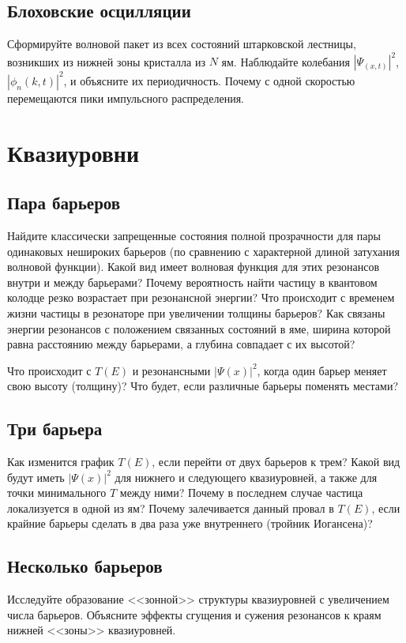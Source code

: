 \documentclass[12pt]{article}
\begin{document}
\hypertarget{WP_Stark_state}{}\subsection[Блоховские осцилляции]
{Блоховские осцилляции}
Сформируйте волновой пакет из всех состояний штарковской
лестницы, возникших из нижней зоны кристалла из $N$ ям.
Наблюдайте колебания $|\Psi_(x,t)|^2$, $|\phi_n(k,t)|^2$, и
объясните их периодичность. Почему с одной скоростью перемещаются
пики импульсного распределения.

\hypertarget{quasilevel}{}\section{Квазиуровни}
\hypertarget{quasilevel_two_barrier}{}\subsection{Пара барьеров}
Найдите классически запрещенные состояния полной прозрачности
для пары одинаковых нешироких барьеров (по сравнению
с характерной длиной затухания волновой функции).
Какой вид имеет волновая функция для этих резонансов внутри
и между барьерами? Почему вероятность найти частицу  в квантовом
колодце резко возрастает при резонансной энергии? Что происходит
с временем жизни частицы в резонаторе при увеличении толщины
барьеров? Как  связаны  энергии  резонансов  с  положением
связанных состояний в яме, ширина которой равна расстоянию между
барьерами, а глубина совпадает с их высотой?

Что происходит с $T(E)$ и резонансными $|\Psi(x)|^2$, когда один
барьер меняет свою высоту (толщину)? Что будет, если различные
барьеры поменять местами?

\hypertarget{three_barrier}{}\subsection{Три барьера}
Как изменится график $T(E)$, если  перейти от двух барьеров к
трем? Какой вид будут иметь $|\Psi(x)|^2$ для нижнего и
следующего
квазиуровней, а также для  точки  минимального  $T$  между  ними?
Почему в последнем случае частица локализуется в одной из ям?
Почему залечивается данный провал в $T(E)$, если крайние барьеры
сделать в два раза уже внутреннего (тройник Иогансена)?

\hypertarget{N_barrier}{}\subsection{Несколько барьеров}
Исследуйте  образование <<зонной>>  структуры квазиуровней  с
увеличением числа барьеров. Объясните эффекты сгущения и сужения
резонансов к краям нижней <<зоны>> квазиуровней.
\end{document}
